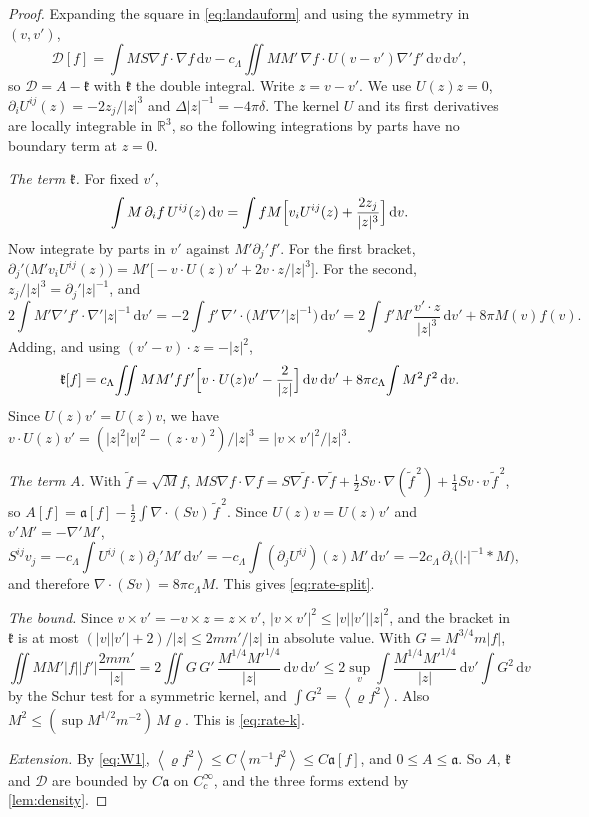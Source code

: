 \documentclass[11pt]{article}
\newcommand{\dd}{\,\mathrm d}
\newcommand{\av}[1]{\left\langle #1\right\rangle}
\newcommand{\D}{\mathcal D}
\newcommand{\RR}{\mathbb R}
\theoremstyle{definition}
\theoremstyle{remark}
\numberwithin{equation}{section}
\begin{document}
\begin{proof}
Expanding the square in \eqref{eq:landauform} and using the symmetry in
$(v,v')$,
\[
 \D[f]=\int MS\nabla f\cdot\nabla f\dd v
   -c_\Lambda\!\iint MM'\,\nabla f\cdot U(v-v')\nabla'f'\dd v\dd v' ,
\]
so $\D=A-\mathfrak k$ with $\mathfrak k$ the double integral. Write
$z=v-v'$. We use $U(z)z=0$, $\partial_iU^{ij}(z)=-2z_j/|z|^3$ and
$\Delta|z|^{-1}=-4\pi\delta$. The kernel $U$ and its first derivatives are
locally integrable in $\RR^3$, so the following integrations by parts have
no boundary term at $z=0$.

\emph{The term $\mathfrak k$.} For fixed $v'$,
\[
 \int M\,\partial_if\,U^{ij}(z)\dd v
  =\int fM\Bigl[v_iU^{ij}(z)+\frac{2z_j}{|z|^3}\Bigr]\dd v .
\]
Now integrate by parts in $v'$ against $M'\partial_j'f'$. For the first
bracket,
$\partial_j'\bigl(M'v_iU^{ij}(z)\bigr)
=M'\bigl[-v\cdot U(z)v'+2v\cdot z/|z|^3\bigr]$.
For the second, $z_j/|z|^3=\partial_j'|z|^{-1}$, and
\[
 2\!\int M'\nabla'f'\cdot\nabla'|z|^{-1}\dd v'
 =-2\!\int f'\,\nabla'\!\cdot\bigl(M'\nabla'|z|^{-1}\bigr)\dd v'
 =2\!\int f'M'\frac{v'\cdot z}{|z|^3}\dd v'+8\pi M(v)f(v).
\]
Adding, and using $(v'-v)\cdot z=-|z|^2$,
\[
 \mathfrak k[f]=c_\Lambda\!\iint MM'ff'\Bigl[v\cdot U(z)v'-\frac2{|z|}\Bigr]
   \dd v\dd v'+8\pi c_\Lambda\!\int M^2f^2\dd v .
\]
Since $U(z)v'=U(z)v$, we have
$v\cdot U(z)v'=(|z|^2|v|^2-(z\cdot v)^2)/|z|^3=|v\times v'|^2/|z|^3$.

\emph{The term $A$.} With $\widetilde f=\sqrt Mf$,
$MS\nabla f\cdot\nabla f=S\nabla\widetilde f\cdot\nabla\widetilde f
+\tfrac12Sv\cdot\nabla(\widetilde f^{\,2})+\tfrac14Sv\cdot v\,\widetilde f^{\,2}$,
so $A[f]=\mathfrak a[f]-\tfrac12\int\nabla\!\cdot(Sv)\,\widetilde f^{\,2}$.
Since $U(z)v=U(z)v'$ and $v'M'=-\nabla'M'$,
\[
 S^{ij}v_j=-c_\Lambda\!\int U^{ij}(z)\partial_j'M'\dd v'
  =-c_\Lambda\!\int(\partial_jU^{ij})(z)M'\dd v'
  =-2c_\Lambda\,\partial_i\bigl(|\cdot|^{-1}*M\bigr),
\]
and therefore $\nabla\!\cdot(Sv)=8\pi c_\Lambda M$. This gives
\eqref{eq:rate-split}.

\emph{The bound.} Since $v\times v'=-v\times z=z\times v'$,
$|v\times v'|^2\leq|v||v'||z|^2$, and the bracket in $\mathfrak k$ is at
most $(|v||v'|+2)/|z|\leq2mm'/|z|$ in absolute value. With
$G=M^{3/4}m|f|$,
\[
 \iint MM'|f||f'|\frac{2mm'}{|z|}
 =2\!\iint G\,G'\,\frac{M^{1/4}M'^{1/4}}{|z|}\dd v\dd v'
 \leq2\sup_v\!\int\!\frac{M^{1/4}M'^{1/4}}{|z|}\dd v'\int G^2\dd v
\]
by the Schur test for a symmetric kernel, and $\int G^2=\av{\varrho f^2}$.
Also $M^2\leq(\sup M^{1/2}m^{-2})\,M\varrho$. This is \eqref{eq:rate-k}.

\emph{Extension.} By \eqref{eq:W1}, $\av{\varrho f^2}\leq C\av{m^{-1}f^2}
\leq C\mathfrak a[f]$, and $0\leq A\leq\mathfrak a$. So $A$, $\mathfrak k$
and $\D$ are bounded by $C\mathfrak a$ on $C_c^\infty$, and the three forms
extend by \cref{lem:density}.
\end{proof}
\end{document}
